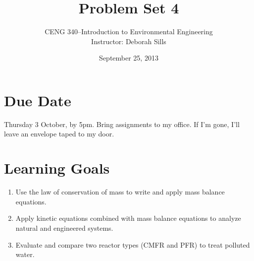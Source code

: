 \documentclass[12pt,letterpaper]{article}
\begin{document}
\setlength{\parindent}{0cm} 


\frenchspacing

\title {Problem Set 4} 
\author {CENG 340--Introduction to Environmental Engineering\\
Instructor: Deborah Sills}
\date {September 25, 2013}
\maketitle

\section *{Due Date}
Thursday 3 October, by 5pm.  Bring assignments to my office.  If I'm gone, I'll leave an envelope taped to my door.

\section *{Learning Goals}
\begin{enumerate}
\item Use the law of conservation of mass to write and apply mass balance equations.
\item Apply kinetic equations combined with mass balance equations to analyze natural and engineered systems.
\item Evaluate and compare two reactor types (CMFR and PFR) to treat polluted water.

\end{enumerate}
\end{document}
